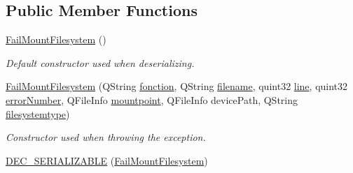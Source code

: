 \subsection*{Public Member Functions}
\begin{DoxyCompactItemize}
\item 
\hyperlink{class_gost_crypt_1_1_core_1_1_fail_mount_filesystem_a9558376bd8426e4e74150434c19d1a13}{Fail\+Mount\+Filesystem} ()
\begin{DoxyCompactList}\small\item\em Default constructor used when deserializing. \end{DoxyCompactList}\item 
\hyperlink{class_gost_crypt_1_1_core_1_1_fail_mount_filesystem_a137787821cb338fab75a390a147593d1}{Fail\+Mount\+Filesystem} (Q\+String \hyperlink{class_gost_crypt_1_1_gost_crypt_exception_a29b8c93d5efbb1ff369107385725a939}{fonction}, Q\+String \hyperlink{class_gost_crypt_1_1_gost_crypt_exception_a749a12375f4ba9d502623b99d8252f38}{filename}, quint32 \hyperlink{class_gost_crypt_1_1_gost_crypt_exception_abf506d911f12a4e969eea500f90bd32c}{line}, quint32 \hyperlink{class_gost_crypt_1_1_core_1_1_mount_filesystem_manager_exception_a1fb5da5dbf91cfd3e664ffb9e2aee9ee}{error\+Number}, Q\+File\+Info \hyperlink{class_gost_crypt_1_1_core_1_1_mount_filesystem_manager_exception_aaa119fba81184433a1422a122be64ca0}{mountpoint}, Q\+File\+Info device\+Path, Q\+String \hyperlink{class_gost_crypt_1_1_core_1_1_fail_mount_filesystem_a73a764c0045dfdb4ad0f0229466b1fa0}{filesystemtype})
\begin{DoxyCompactList}\small\item\em Constructor used when throwing the exception. \end{DoxyCompactList}\item 
\hyperlink{class_gost_crypt_1_1_core_1_1_fail_mount_filesystem_a8b347fd181aec5c45d3494ffa2bc5482}{D\+E\+C\+\_\+\+S\+E\+R\+I\+A\+L\+I\+Z\+A\+B\+LE} (\hyperlink{class_gost_crypt_1_1_core_1_1_fail_mount_filesystem}{Fail\+Mount\+Filesystem})
\end{DoxyCompactItemize}
